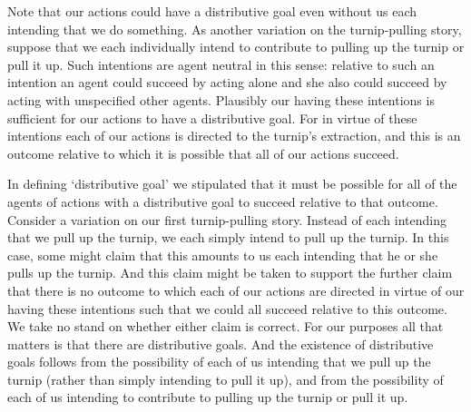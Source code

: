 \documentclass[12pt,a4paper]{extarticle}
\begin{document}

Note that our actions could have a distributive goal even without us each intending that we do something.
As another variation on the turnip-pulling story,
suppose that we each individually intend to 
	contribute to pulling up the turnip or pull it up.
Such intentions are agent neutral in this sense:
relative to such an intention an agent 
	could succeed by acting alone 
and
  she also could succeed by acting with unspecified other agents.
Plausibly our having these intentions is sufficient for our actions to have a distributive goal.
For in virtue of these intentions each of our actions is directed to the turnip's extraction,
and this is an outcome relative to which it is possible that all of our actions succeed.


In defining `distributive goal' we stipulated that it must be possible for all of the agents of actions with a distributive goal to succeed relative to that outcome.
Consider a variation on our first turnip-pulling story.
Instead of each intending that we pull up the turnip,
we each simply intend  to pull up the turnip.
In this case,
some might claim that
this amounts to us each intending that he or she pulls up the turnip.
And this claim might be taken to support the further claim that
there is no outcome to which each of our actions are directed
in virtue of our having these intentions
such that we could all succeed relative to this outcome.
We take no stand on whether either claim is correct.
For our purposes all that matters is that there are distributive goals.
And the existence of distributive goals follows from the possibility of each of us 
intending that we pull up the turnip
(rather than simply
intending to pull it up),
and from the possibility of each of us
intending to contribute to pulling up the turnip or pull it up.
\end{document}
